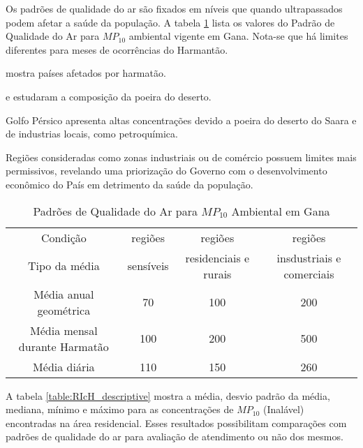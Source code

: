Os padrões de qualidade do ar são fixados em níveis que quando ultrapassados 
podem afetar a saúde da população. 
A tabela \ref{table:padroesgana} lista os valores do Padrão de Qualidade do Ar 
para $MP_{10}$ ambiental vigente em Gana. Nota-se que há limites diferentes para 
meses de ocorrências do Harmantão. 

\cite{prospero2002} mostra países afetados por harmatão. 

\cite{engelbrecht2009a} e \citep{engelbrecht2009b} estudaram a composição 
da poeira do deserto.

\citep{kaku2016} Golfo Pérsico apresenta altas concentrações devido a poeira do 
deserto do Saara e de industrias locais, como petroquímica. 

Regiões consideradas como zonas
industriais ou de comércio possuem limites mais permissivos, revelando 
uma priorização do Governo com o desenvolvimento econômico do País em 
detrimento da saúde da população.

\begin{table}[H]
\centering
\begin{tabular}{cccc}
\hline
Condição                      &   regiões  &        regiões       &         regiões               \\
Tipo da média                 & sensíveis & residenciais e rurais & insdustriais e comerciais      \\
\hline
Média anual geométrica        & 70              & 100                      & 200                   \\
Média mensal durante Harmatão & 100             & 200                      & 500                     \\
Média diária                  & 110             & 150                      & 260         \\               
\hline
\end{tabular}
\caption{Padrões de Qualidade do Ar para $MP_{10}$ Ambiental em Gana
         \cite{epa2015} \label{table:padroesgana}}
\end{table}

A tabela \ref{table:RIcH_descriptive} mostra a média, desvio padrão da média,
mediana, mínimo e máximo para as concentrações de $MP_{10}$ (Inalável) 
encontradas na área residencial. Esses resultados possibilitam comparações com 
padrões de qualidade do ar para avaliação de atendimento ou não dos mesmos.    

